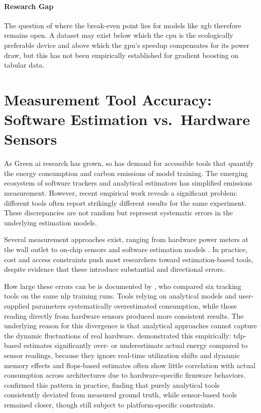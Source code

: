 \paragraph{Research Gap}
The question of where the break-even point lies for models like \gls{xgb} therefore remains open. A dataset may exist below which the \gls{cpu} is the ecologically preferable device and above which the \gls{gpu}'s speedup compensates for its power draw, but this has not been empirically established for gradient boosting on tabular data.

\section{Measurement Tool Accuracy: Software Estimation vs.\ Hardware Sensors}
\label{sec:related_measurement}

As Green \gls{ai} research has grown, so has demand for accessible tools that quantify the energy consumption and carbon emissions of model training. The emerging ecosystem of software trackers and analytical estimators has simplified emissions measurement. However, recent empirical work reveals a significant problem: different tools often report strikingly different results for the same experiment. These discrepancies are not random but represent systematic errors in the underlying estimation models.

Several measurement approaches exist, ranging from hardware power meters at the wall outlet to on-chip sensors and software estimation models \cite{rodriguezEvaluatingEnergyConsumption2024}. In practice, cost and access constraints push most researchers toward estimation-based tools, despite evidence that these introduce substantial and directional errors.

How large these errors can be is documented by \citeauthor{bannourEvaluatingCarbonFootprint2021} \cite{bannourEvaluatingCarbonFootprint2021}, who compared six tracking tools on the same \gls{nlp} training runs. Tools relying on analytical models and user-supplied parameters systematically overestimated consumption, while those reading directly from hardware sensors produced more consistent results. The underlying reason for this divergence is that analytical approaches cannot capture the dynamic fluctuations of real hardware. \citeauthor{hendersonSystematicReportingEnergy2020} \cite{hendersonSystematicReportingEnergy2020} demonstrated this empirically: \gls{tdp}-based estimates significantly over- or underestimate actual energy compared to sensor readings, because they ignore real-time utilization shifts and dynamic memory effects and \glspl{flop}-based estimates often show little correlation with actual consumption across architectures due to hardware-specific firmware behaviors. \citeauthor{rodriguezEvaluatingEnergyConsumption2024} \cite{rodriguezEvaluatingEnergyConsumption2024} confirmed this pattern in practice, finding that purely analytical tools consistently deviated from measured ground truth, while sensor-based tools remained closer, though still subject to platform-specific constraints.

